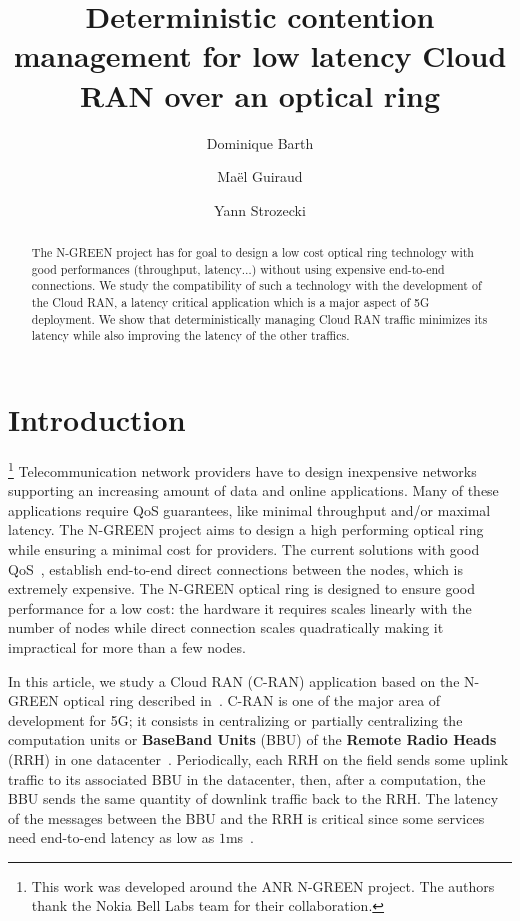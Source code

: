 \documentclass[10pt, conference, letterpaper]{IEEEtran}
\title{Deterministic contention management for low latency Cloud RAN over an optical ring}
\author[1]{Dominique Barth}
\author[1,2]{Ma\"el Guiraud}
\author[1]{Yann Strozecki}
\affil[1]{David Laboratory, UVSQ}
\affil[2]{Nokia Bell Labs France}
\begin{document}
\maketitle


\begin{abstract}
The N-GREEN project has for goal to design a low cost optical ring technology with good performances (throughput, latency$\dots$) without using expensive end-to-end connections. We study the compatibility of such a technology with the development of the Cloud RAN, a latency critical application which is a major aspect of 5G deployment. We show that deterministically managing Cloud RAN traffic minimizes its latency while also improving the latency of the other traffics. 

\end{abstract}


\section{Introduction}

\footnote{This work was developed around the ANR N-GREEN project. The authors thank the Nokia Bell Labs team for their collaboration.} Telecommunication network providers have to design inexpensive networks supporting an increasing amount of data and online applications. Many of these applications require QoS guarantees, like minimal throughput and/or  maximal latency. The N-GREEN project aims to design a high performing optical ring while ensuring a minimal cost for providers. The current solutions with good QoS~\cite{pizzinat2015things,tayq2017real}, establish end-to-end direct connections between the nodes, which is extremely expensive. The N-GREEN optical ring is designed to ensure good performance for a low cost: the hardware it requires scales linearly with the number of nodes while direct connection scales quadratically making it impractical for more than a few nodes.


In this article, we study a Cloud RAN (C-RAN) application based on the N-GREEN optical ring described in~\cite{ngreenarchitecture,uscumlic2018scalable}. C-RAN is one of the major area of development for 5G; it consists in centralizing or partially centralizing the computation units or {\bf BaseBand Units} (BBU) of the {\bf Remote Radio Heads} (RRH) in one datacenter~\cite{mobile2011c}. Periodically, each RRH on the field sends some uplink traffic to its associated BBU in the datacenter, then, after a computation, the BBU sends the same quantity of downlink traffic back to the RRH. The latency of the messages between the BBU and the RRH is critical since some services need end-to-end latency as low as $1$ms~\cite{3gpp5g,boccardi2014five}.
\end{document}
